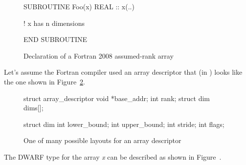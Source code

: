 \begin{figure}[!ht]
\begin{nlnlisting}
  SUBROUTINE Foo(x)
    REAL :: x(..)

    ! x has n dimensions
  
  END SUBROUTINE
\end{nlnlisting}
\caption{Declaration of a Fortran 2008 assumed-rank array}
\label{fig:assumedrankdecl}
\end{figure}

Let's assume the Fortran compiler used an array descriptor that
(in ) looks
like the one shown in Figure~\ref{fig:arraydesc}.

\begin{figure}[!ht]
\begin{nlnlisting}
  struct array_descriptor {
    void *base_addr;
    int rank;
    struct dim dims[]; 
  }

  struct dim {
     int lower_bound;
     int upper_bound;
     int stride;
     int flags;
  }
\end{nlnlisting}
\caption{One of many possible layouts for an array descriptor}
\label{fig:arraydesc}
\end{figure}

The DWARF type for the array \emph{x} can be described as shown in
Figure~.

